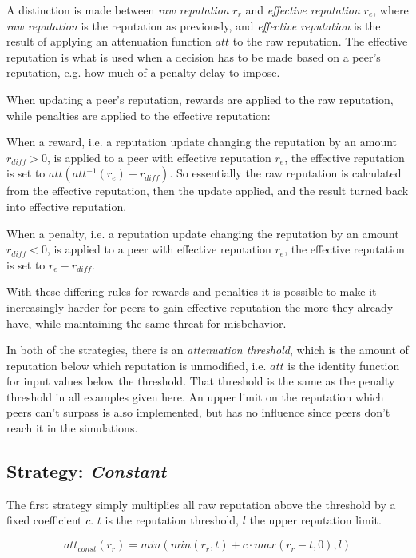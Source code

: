 A distinction is made between \emph{raw reputation} $r_r$ and \emph{effective
reputation} $r_e$, where \emph{raw reputation} is the reputation as previously,
and \emph{effective reputation} is the result of applying an attenuation
function $att$ to the raw reputation. The effective reputation is what is used
when a decision has to be made based on a peer's reputation, e.g. how much of a
penalty delay to impose.

When updating a peer's reputation, rewards are applied to the raw reputation,
while penalties are applied to the effective reputation:

When a reward, i.e. a reputation update changing the reputation by an amount
$r_{diff} > 0$, is applied to a peer with effective reputation $r_e$, the
effective reputation is set to $att(att^{-1}(r_e) + r_{diff})$. So essentially
the raw reputation is calculated from the effective reputation, then the update
applied, and the result turned back into effective reputation.

When a penalty, i.e. a reputation update changing the reputation by an amount
$r_{diff} < 0$, is applied to a peer with effective reputation $r_e$, the
effective reputation is set to $r_e - r_{diff}$.

With these differing rules for rewards and penalties it is possible to make it
increasingly harder for peers to gain effective reputation the more they already
have, while maintaining the same threat for misbehavior.

In both of the strategies, there is an \emph{attenuation threshold}, which is
the amount of reputation below which reputation is unmodified, i.e. $att$ is the
identity function for input values below the threshold. That threshold is the
same as the penalty threshold in all examples given here. An upper limit on the
reputation which peers can't surpass is also implemented, but has no influence
since peers don't reach it in the simulations.

\subsection{Strategy: \emph{Constant}}
The first strategy simply multiplies all raw reputation above the threshold by a
fixed coefficient $c$. $t$ is the reputation threshold, $l$ the upper reputation
limit.

\[att_{const}(r_r) = min(min(r_r, t) + c \cdot max(r_r - t, 0), l)\]

